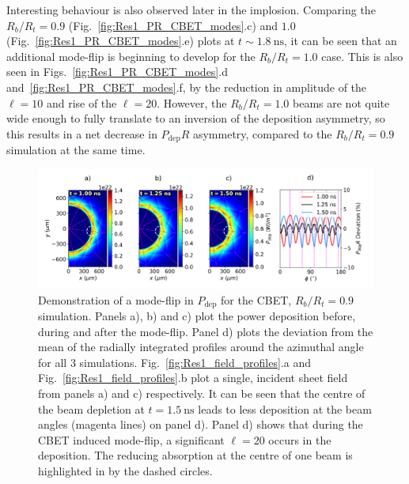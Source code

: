 Interesting behaviour is also observed later in the implosion.
Comparing the $R_b/R_t=0.9$ (Fig.~\ref{fig:Res1_PR_CBET_modes}.c) and $1.0$ (Fig.~\ref{fig:Res1_PR_CBET_modes}.e) plots at $t\sim1.8\ \text{ns}$, it can be seen that an additional mode-flip is beginning to develop for the $R_b/R_t=1.0$ case.
This is also seen in Figs.~\ref{fig:Res1_PR_CBET_modes}.d and~\ref{fig:Res1_PR_CBET_modes}.f, by the reduction in amplitude of the $\ell=10$ and rise of the $\ell=20$.
However, the $R_b/R_t=1.0$ beams are not quite wide enough to fully translate to an inversion of the deposition asymmetry, so this results in a net decrease in $P_{\text{dep}}R$ asymmetry, compared to the $R_b/R_t=0.9$ simulation at the same time.

\begin{figure}[t!]
    \includegraphics[width=\linewidth]{Results1/Images/CBET_modeflip.png}
    \centering
    \caption{Demonstration of a mode-flip in $P_{\text{dep}}$ for the \ac{CBET}, $R_b/R_t=0.9$ simulation.
    Panels a), b) and c) plot the power deposition before, during and after the mode-flip.
    Panel d) plots the deviation from the mean of the radially integrated profiles around the azimuthal angle for all 3 simulations.
    Fig.~\ref{fig:Res1_field_profiles}.a and Fig.~\ref{fig:Res1_field_profiles}.b plot a single, incident sheet field from panels a) and c) respectively.
    It can be seen that the centre of the beam depletion at $t=1.5\ \text{ns}$ leads to less deposition at the beam angles (magenta lines) on panel d).
    Panel d) shows that during the \ac{CBET} induced mode-flip, a significant $\ell=20$ occurs in the deposition.
    The reducing absorption at the centre of one beam is highlighted in by the dashed circles.}%
    \label{fig:Res1_CBET_Deposition_change}
\end{figure}

